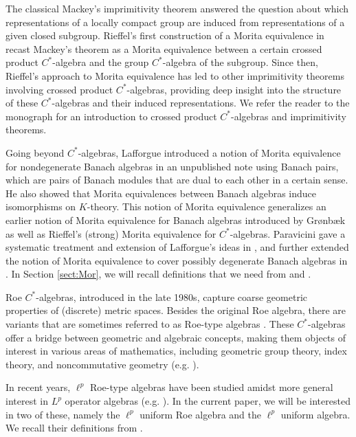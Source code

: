 \documentclass[a4,11pt]{amsart}
\theoremstyle{remark}
\begin{document}
The classical Mackey's imprimitivity theorem \cite[Theorem 2]{Mac49} answered the question about which representations of a locally compact group are induced from representations of a given closed subgroup. Rieffel's first construction of a Morita equivalence in \cite{Rie74} recast Mackey's theorem as a Morita equivalence between a certain crossed product $C^*$-algebra and the group $C^*$-algebra of the subgroup.
Since then, Rieffel's approach to Morita equivalence has led to other imprimitivity theorems involving crossed product $C^*$-algebras, providing deep insight into the structure of these $C^*$-algebras and their induced representations.
We refer the reader to the monograph \cite{Wil} for an introduction to crossed product $C^*$-algebras and imprimitivity theorems.


Going beyond $C^*$-algebras, Lafforgue introduced a notion of Morita equivalence for nondegenerate Banach algebras in an unpublished note \cite{Laf04} using Banach pairs, which are pairs of Banach modules that are dual to each other in a certain sense. He also showed that Morita equivalences between Banach algebras induce isomorphisms on $K$-theory.
This notion of Morita equivalence generalizes an earlier notion of Morita equivalence for Banach algebras introduced by Gr\o{}nb\ae k \cite{Gro95,Gro96} as well as Rieffel's (strong) Morita equivalence for $C^*$-algebras.
Paravicini gave a systematic treatment and extension of Lafforgue's ideas in \cite{Par09}, and further extended the notion of Morita equivalence to cover possibly degenerate Banach algebras in \cite[Section 1.2]{Par15}.
In Section \ref{sect:Mor}, we will recall definitions that we need from \cite{Laf02} and \cite{Par09}.

Roe $C^*$-algebras, introduced in the late 1980s, capture coarse geometric properties of (discrete) metric spaces.
Besides the original Roe algebra, there are variants that are sometimes referred to as Roe-type algebras \cite[Definition 2.1]{SW13a}.
These $C^*$-algebras offer a bridge between geometric and algebraic concepts, making them objects of interest in various areas of mathematics, including geometric group theory, index theory, and noncommutative geometry (e.g. \cite{Chung20,LL,LW,SW13,SW13a,Wei,Yu00}). 

In recent years, $\ell^p$ Roe-type algebras have been studied \cite{Chung18,Chung21a,Chung23,LWZ,SW,ZZ} amidst more general interest in $L^p$ operator algebras (e.g. \cite{G21,GL,GT16,GT19,GT22,HP,Phil12,Phil13,WW,WZ}). 
In the current paper, we will be interested in two of these, namely the $\ell^p$ uniform Roe algebra and the $\ell^p$ uniform algebra.
We recall their definitions from \cite{Chung18}.
\end{document}
